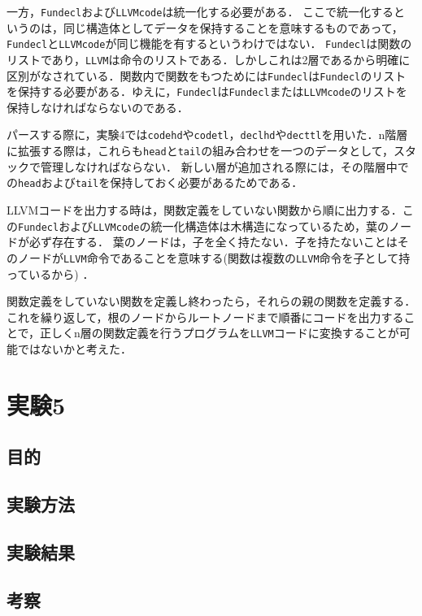 \documentclass[uplatex]{jsarticle}
\begin{document}
一方，\verb#Fundecl#および\verb#LLVMcode#は統一化する必要がある．
ここで統一化するというのは，同じ構造体としてデータを保持することを意味するものであって，\verb#Fundecl#と\verb#LLVMcode#が同じ機能を有するというわけではない．
\verb#Fundecl#は関数のリストであり，\verb#LLVM#は命令のリストである．しかしこれは2層であるから明確に区別がなされている．関数内で関数をもつためには\verb#Fundecl#は\verb#Fundecl#のリストを保持する必要がある．ゆえに，\verb#Fundecl#は\verb#Fundecl#または\verb#LLVMcode#のリストを保持しなければならないのである．

パースする際に，実験4では\verb#codehd#や\verb#codetl#，\verb#declhd#や\verb#decttl#を用いた．n階層に拡張する際は，これらも\verb#head#と\verb#tail#の組み合わせを一つのデータとして，スタックで管理しなければならない．
新しい層が追加される際には，その階層中での\verb#head#および\verb#tail#を保持しておく必要があるためである．

LLVMコードを出力する時は，関数定義をしていない関数から順に出力する．この\verb#Fundecl#および\verb#LLVMcode#の統一化構造体は木構造になっているため，葉のノードが必ず存在する．
葉のノードは，子を全く持たない．子を持たないことはそのノードが\verb#LLVM#命令であることを意味する(関数は複数の\verb#LLVM#命令を子として持っているから)
．

関数定義をしていない関数を定義し終わったら，それらの親の関数を定義する．これを繰り返して，根のノードからルートノードまで順番にコードを出力することで，正しくn層の関数定義を行うプログラムを\verb#LLVM#コードに変換することが可能ではないかと考えた．

\section{実験5}
\subsection{目的}
\subsection{実験方法}
\subsection{実験結果}
\subsection{考察}
\end{document}
